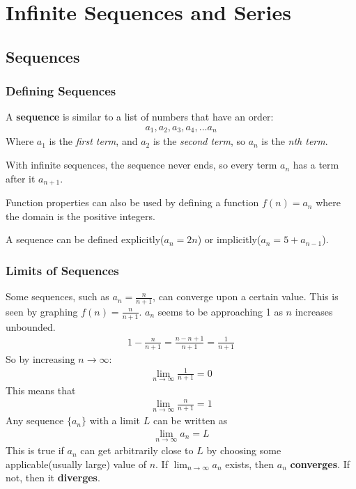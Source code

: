 \documentclass{article}
\begin{document}
\section{Infinite Sequences and Series}
\subsection{Sequences}
\subsubsection{Defining Sequences}
A \textbf{sequence} is similar to a list of numbers that have an order:
\begin{gather*}
    a_1,a_2,a_3,a_4,...a_n
\end{gather*}
Where $a_1$ is the \textit{first term}, and $a_2$ is the \textit{second term}, so $a_n$ is the \textit{nth term}.

With infinite sequences, the sequence never ends, so every term $a_n$ has a term after it $a_{n+1}$.

Function properties can also be used by defining a function $f(n) = a_n$ where the domain is the positive integers.

A sequence can be defined explicitly($a_n=2n$) or implicitly($a_n = 5 + a_{n-1}$).
\subsubsection{Limits of Sequences}
Some sequences, such as $a_n = \frac{n}{n+1}$, can converge upon a certain value. This is seen by graphing $f(n) = \frac{n}{n+1}$. $a_n$ seems to be approaching 1 as $n$ increases unbounded.
\begin{gather*}
    1 - \frac{n}{n+1} = \frac{n-n+1}{n+1} = \frac{1}{n+1}
\end{gather*}
So by increasing $n \to \infty$:
\begin{gather*}
    \lim_{n\to \infty} \frac{1}{n+1} = 0
\end{gather*}
This means that
\begin{gather*}
    \lim_{n\to \infty} \frac{n}{n+1} = 1
\end{gather*}
Any sequence $\{a_n\}$ with a limit $L$ can be written as
\begin{gather*}
    \lim_{n\to \infty} a_n = L
\end{gather*}
This is true if $a_n$ can get arbitrarily close to $L$ by choosing some applicable(usually large) value of $n$. If $\lim_{n\to \infty} a_n$ exists, then $a_n$ \textbf{converges}. If not, then it \textbf{diverges}.
\end{document}
